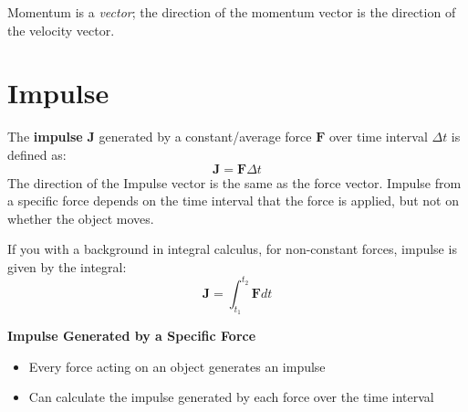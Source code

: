 Momentum is a \emph{vector}; the direction of the momentum vector is the
direction of the velocity vector.



%
%
%
%
%
\section{Impulse}
The \textbf{impulse} $\bm J$ generated by a constant/average force $\bm F$
over time interval $\Delta t$ is defined as:
\begin{equation}
  \boxed{\bm J=\bm F\Delta t}
\end{equation}
The direction of the Impulse vector is the same as the force vector. Impulse
from a specific force depends on the time interval that the force is applied,
but not on whether the object moves.


\begin{remark}
  If you with a background in integral calculus, for non-constant forces,
  impulse is given by the integral:
  \begin{equation*}
    \bm J=\int_{t_1}^{t_2}\bm F dt
  \end{equation*}
\end{remark}
%
%
%
\textbf{Impulse Generated by a Specific Force}
\begin{itemize}
\item Every force acting on an object generates an impulse
\item Can calculate the impulse generated by each force over the time interval
\end{itemize}

